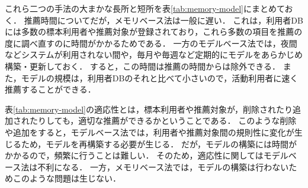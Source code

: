 これら二つの手法の大まかな長所と短所を表\ref{tab:memory-model}にまとめておく．
推薦時間についてだが，メモリベース法は一般に遅い．
これは，利用者DBには多数の標本利用者や推薦対象が登録されており，これら多数の項目を推薦の度に調べ直すのに時間がかかるためである．
一方のモデルベース法では，夜間などシステムが利用されない間や，毎月や毎週など定期的にモデルをあらかじめ構築・更新しておく．
すると，この時間は推薦の時間からは除外できる．
また，モデルの規模は，利用者DBのそれと比べて小さいので，活動利用者に速く推薦することができる．

表\ref{tab:memory-model}の適応性とは，標本利用者や推薦対象が，削除されたり追加されたりしても，適切な推薦ができるかということである．
このような削除や追加をすると，モデルベース法では，利用者や推薦対象間の規則性に変化が生じるため，モデルを再構築する必要が生じる．
だが，モデルの構築には時間がかかるので，頻繁に行うことは難しい．
そのため，適応性に関してはモデルベース法は不利になる．
一方，メモリベース法では，モデルの構築は行わないためこのような問題は生じない．

